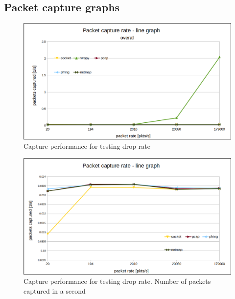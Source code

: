 \documentclass[12pt,a4paper,twoside]{report}
\begin{document}
\begin{appendices}
	\chapter{Packet capture graphs} \label{appendix:tests:graph:drops}
		\begin{figure}[h]
			\centering
			\includegraphics[scale=0.5]{overall_drops_line-graph}
			\caption{Capture performance for testing drop rate}
			\label{figure:tests:alldrops}
		\end{figure}
		\begin{figure}[h]
			\centering
			\includegraphics[scale=0.5]{closeup_drops_line-graph}
			\caption{Capture performance for testing drop rate. Number of packets captured in a second}
			\label{figure:tests:closedrops}
		\end{figure}

\end{appendices}
\end{document}
